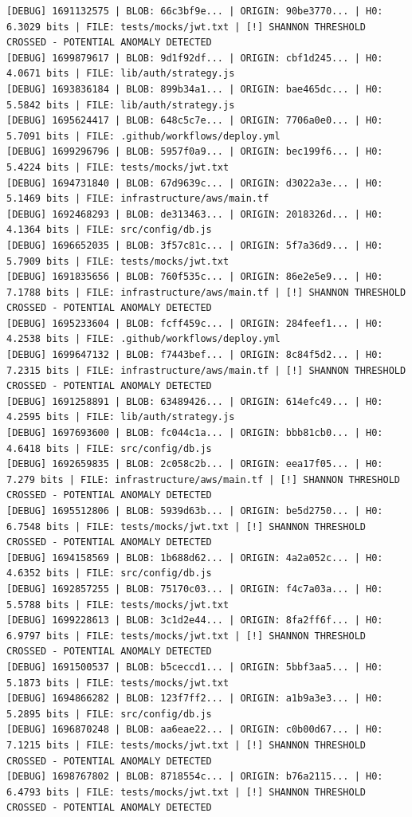 \documentclass[12pt, a4paper, oneside]{report}
\begin{document}
\begin{lstlisting}[basicstyle=\tiny\ttfamily]
[DEBUG] 1691132575 | BLOB: 66c3bf9e... | ORIGIN: 90be3770... | H0: 6.3029 bits | FILE: tests/mocks/jwt.txt | [!] SHANNON THRESHOLD CROSSED - POTENTIAL ANOMALY DETECTED
[DEBUG] 1699879617 | BLOB: 9d1f92df... | ORIGIN: cbf1d245... | H0: 4.0671 bits | FILE: lib/auth/strategy.js
[DEBUG] 1693836184 | BLOB: 899b34a1... | ORIGIN: bae465dc... | H0: 5.5842 bits | FILE: lib/auth/strategy.js
[DEBUG] 1695624417 | BLOB: 648c5c7e... | ORIGIN: 7706a0e0... | H0: 5.7091 bits | FILE: .github/workflows/deploy.yml
[DEBUG] 1699296796 | BLOB: 5957f0a9... | ORIGIN: bec199f6... | H0: 5.4224 bits | FILE: tests/mocks/jwt.txt
[DEBUG] 1694731840 | BLOB: 67d9639c... | ORIGIN: d3022a3e... | H0: 5.1469 bits | FILE: infrastructure/aws/main.tf
[DEBUG] 1692468293 | BLOB: de313463... | ORIGIN: 2018326d... | H0: 4.1364 bits | FILE: src/config/db.js
[DEBUG] 1696652035 | BLOB: 3f57c81c... | ORIGIN: 5f7a36d9... | H0: 5.7909 bits | FILE: tests/mocks/jwt.txt
[DEBUG] 1691835656 | BLOB: 760f535c... | ORIGIN: 86e2e5e9... | H0: 7.1788 bits | FILE: infrastructure/aws/main.tf | [!] SHANNON THRESHOLD CROSSED - POTENTIAL ANOMALY DETECTED
[DEBUG] 1695233604 | BLOB: fcff459c... | ORIGIN: 284feef1... | H0: 4.2538 bits | FILE: .github/workflows/deploy.yml
[DEBUG] 1699647132 | BLOB: f7443bef... | ORIGIN: 8c84f5d2... | H0: 7.2315 bits | FILE: infrastructure/aws/main.tf | [!] SHANNON THRESHOLD CROSSED - POTENTIAL ANOMALY DETECTED
[DEBUG] 1691258891 | BLOB: 63489426... | ORIGIN: 614efc49... | H0: 4.2595 bits | FILE: lib/auth/strategy.js
[DEBUG] 1697693600 | BLOB: fc044c1a... | ORIGIN: bbb81cb0... | H0: 4.6418 bits | FILE: src/config/db.js
[DEBUG] 1692659835 | BLOB: 2c058c2b... | ORIGIN: eea17f05... | H0: 7.279 bits | FILE: infrastructure/aws/main.tf | [!] SHANNON THRESHOLD CROSSED - POTENTIAL ANOMALY DETECTED
[DEBUG] 1695512806 | BLOB: 5939d63b... | ORIGIN: be5d2750... | H0: 6.7548 bits | FILE: tests/mocks/jwt.txt | [!] SHANNON THRESHOLD CROSSED - POTENTIAL ANOMALY DETECTED
[DEBUG] 1694158569 | BLOB: 1b688d62... | ORIGIN: 4a2a052c... | H0: 4.6352 bits | FILE: src/config/db.js
[DEBUG] 1692857255 | BLOB: 75170c03... | ORIGIN: f4c7a03a... | H0: 5.5788 bits | FILE: tests/mocks/jwt.txt
[DEBUG] 1699228613 | BLOB: 3c1d2e44... | ORIGIN: 8fa2ff6f... | H0: 6.9797 bits | FILE: tests/mocks/jwt.txt | [!] SHANNON THRESHOLD CROSSED - POTENTIAL ANOMALY DETECTED
[DEBUG] 1691500537 | BLOB: b5ceccd1... | ORIGIN: 5bbf3aa5... | H0: 5.1873 bits | FILE: tests/mocks/jwt.txt
[DEBUG] 1694866282 | BLOB: 123f7ff2... | ORIGIN: a1b9a3e3... | H0: 5.2895 bits | FILE: src/config/db.js
[DEBUG] 1696870248 | BLOB: aa6eae22... | ORIGIN: c0b00d67... | H0: 7.1215 bits | FILE: tests/mocks/jwt.txt | [!] SHANNON THRESHOLD CROSSED - POTENTIAL ANOMALY DETECTED
[DEBUG] 1698767802 | BLOB: 8718554c... | ORIGIN: b76a2115... | H0: 6.4793 bits | FILE: tests/mocks/jwt.txt | [!] SHANNON THRESHOLD CROSSED - POTENTIAL ANOMALY DETECTED
\end{lstlisting}
\end{document}
